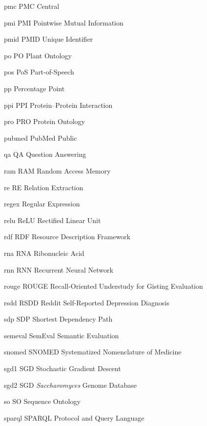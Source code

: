 \newabbreviation
{pmc}
{PMC}
{ Central}

\newabbreviation
{pmi}
{PMI}
{Pointwise Mutual Information}

\newabbreviation
{pmid}
{PMID}
{ Unique Identifier}

\newabbreviation
{po}
{PO}
{Plant Ontology}

\newabbreviation
{pos}
{PoS}
{Part-of-Speech}

{pp}
{Percentage Point}

\newabbreviation
{ppi}
{PPI}
{Protein--Protein Interaction}

\newabbreviation
{pro}
{PRO}
{Protein Ontology}

\newabbreviation
{pubmed}
{PubMed}
{Public }

\newabbreviation
{qa}
{QA}
{Question Answering}

\newabbreviation
{ram}
{RAM}
{Random Access Memory}

\newabbreviation
{re}
{RE}
{Relation Extraction}

{regex}
{Regular Expression}

\newabbreviation
{relu}
{ReLU}
{Rectified Linear Unit}

\newabbreviation
{rdf}
{RDF}
{Resource Description Framework}

\newabbreviation
{rna}
{RNA}
{Ribonucleic Acid}

\newabbreviation
{rnn}
{RNN}
{Recurrent Neural Network}

\newabbreviation
{rouge}
{ROUGE}
{Recall-Oriented Understudy for Gisting Evaluation}

\newabbreviation
{rsdd}
{RSDD}
{Reddit Self-Reported Depression Diagnosis}

\newabbreviation
{sdp}
{SDP}
{Shortest Dependency Path}

\newabbreviation
{semeval}
{SemEval}
{Semantic Evaluation}

\newabbreviation
{snomed}
{SNOMED}
{Systematized Nomenclature of Medicine}

\newabbreviation
{sgd1}
{SGD}
{Stochastic Gradient Descent}

\newabbreviation
{sgd2}
{SGD}
{\textit{Saccharomyces} Genome Database}

\newabbreviation
{so}
{SO}
{Sequence Ontology}

\newabbreviation
{sparql}
{SPARQL}
{ Protocol and  Query Language}

